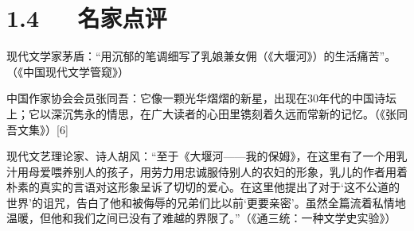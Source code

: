\documentclass[letterpaper,10pt,english]{sphinxmanual}
\begin{document}
\section{1.4   名家点评}
\label{\detokenize{p01_u6563_u6587/_u827e_u9752-_u5927_u5830_u6cb3_u2014_u2014_u6211_u7684_u4fdd_u59c6:id6}}
现代文学家茅盾：“用沉郁的笔调细写了乳娘兼女佣（《大堰河》）的生活痛苦”。（《中国现代文学管窥》）

中国作家协会会员张同吾：它像一颗光华熠熠的新星，出现在30年代的中国诗坛上；它以深沉隽永的情思，在广大读者的心田里镌刻着久远而常新的记忆。（《张同吾文集》）{[}6{]}

现代文艺理论家、诗人胡风：“至于《大堰河——我的保姆》，在这里有了一个用乳汁用母爱喂养别人的孩子，用劳力用忠诚服侍别人的农妇的形象，乳儿的作者用着朴素的真实的言语对这形象呈诉了切切的爱心。在这里他提出了对于‘这不公道的世界’的诅咒，告白了他和被侮辱的兄弟们比以前‘更要亲密’。虽然全篇流着私情地温暖，但他和我们之间已没有了难越的界限了。”（《通三统：一种文学史实验》）
\end{document}
